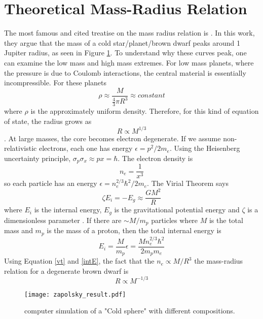 \documentclass[twocolumn]{emulateapj}
\begin{document}
\section{Theoretical Mass-Radius Relation}
The most famous and cited treatise on the mass radius relation is \citet{zapolsky}. In this work, they argue that the mass of a cold star/planet/brown dwarf peaks around 1 Jupiter radius, as seen in Figure \ref{zapolfig}. To understand why these curves peak, one can examine the low mass and high mass extremes. For low mass planets, where the pressure is due to Coulomb interactions, the central material is essentially incompressible. For these planets
\begin{equation}
\rho \approx \frac{M}{\frac{4}{3} \pi R^3} \approx constant
\end{equation}
where $\rho$ is the approximately uniform density.
Therefore, for this kind of equation of state, the radius grows as
\begin{equation}
R \propto M^{1/3}
\end{equation}
. At large masses, the core becomes electron degenerate. If we assume non-relativistic electrons, each one has energy $\epsilon = p^2/2 m_e$. Using the Heisenberg uncertainty principle, $\sigma_p \sigma_x \approx p x = \hbar$. The electron density is
\begin{equation}
n_e = \frac{1}{x^3}
\end{equation}
so each particle has an energy $\epsilon = n_e^{2/3} \hbar^2 / 2m_e$. The Virial Theorem says
\begin{equation}\label{vt}
\zeta E_i = - E_g \approx \frac{G M^2}{R}
\end{equation}
where $E_i$ is the internal energy, $E_g$ is the gravitational potential energy and $\zeta$ is a dimensionless parameter \citep{kippenhahn}. If there are $\sim M/m_p$ particles where $M$ is the total mass and $m_p$ is the mass of a proton, then the total internal energy is
\begin{equation} \label{intE}
E_i = \frac{M}{m_p} \epsilon = \frac{M n_e^{2/3} \hbar^2}{2 m_p m_e}
\end{equation}
Using Equation \ref{vt} and \ref{intE}, the fact that the $n_e \propto M/R^3$ the mass-radius relation for a degenerate brown dwarf is 
\begin{equation}
R \propto M^{-1/3}
\end{equation}

\begin{figure}[!htbp]
\begin{center}
\vspace{0.2in}
\texttt{[image: zapolsky\_result.pdf]}
\caption{\citet{zapolsky} computer simulation of a "Cold sphere" with different compositions.}
\label{zapolfig}
\end{center}
\end{figure}
\end{document}
